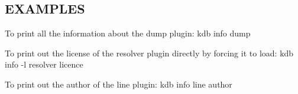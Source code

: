 \subsection*{E\+X\+A\+M\+P\+L\+ES}

To print all the information about the {\ttfamily dump} plugin\+: {\ttfamily kdb info dump}

To print out the license of the {\ttfamily resolver} plugin directly by forcing it to load\+: {\ttfamily kdb info -\/l resolver licence}

To print out the author of the {\ttfamily line} plugin\+: {\ttfamily kdb info line author} 
